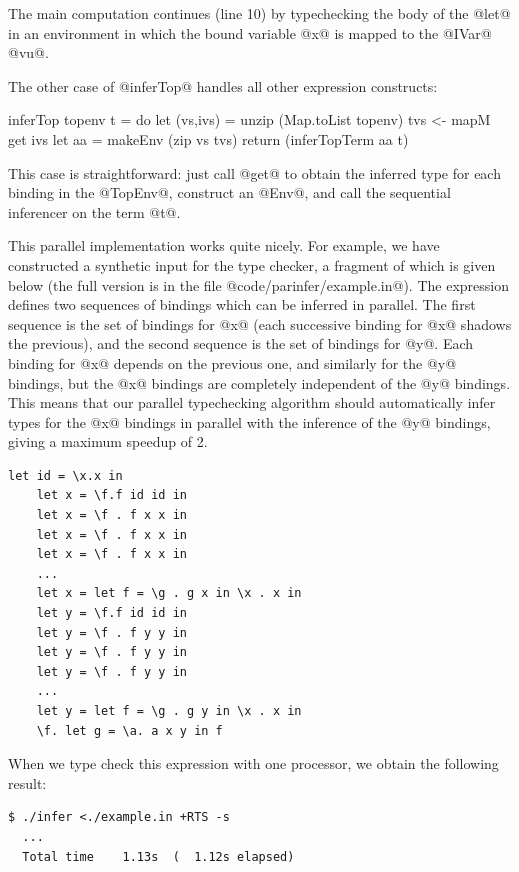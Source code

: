 The main computation continues (line 10) by typechecking the body of
the @let@ in an environment in which the bound variable @x@ is mapped
to the @IVar@ @vu@.

The other case of @inferTop@ handles all other expression constructs:

\begin{numhaskell}
inferTop topenv t = do
    let (vs,ivs) = unzip (Map.toList topenv)
    tvs <- mapM get ivs
    let aa = makeEnv (zip vs tvs)
    return (inferTopTerm aa t)
\end{numhaskell}

\noindent This case is straightforward: just call @get@ to obtain the
inferred type for each binding in the @TopEnv@, construct an
@Env@, and call the sequential inferencer on the term @t@.

This parallel implementation works quite nicely.  For example, we have
constructed a synthetic input for the type checker, a fragment of
which is given below (the full version is in the file
@code/parinfer/example.in@).  The expression defines two sequences of
bindings which can be inferred in parallel.  The first sequence is the
set of bindings for @x@ (each successive binding for @x@ shadows the
previous), and the second sequence is the set of bindings for @y@.
Each binding for @x@ depends on the previous one, and similarly for
the @y@ bindings, but the @x@ bindings are completely independent of
the @y@ bindings.  This means that our parallel typechecking algorithm
should automatically infer types for the @x@ bindings in parallel with
the inference of the @y@ bindings, giving a maximum speedup of 2.

{\small \begin{verbatim}
let id = \x.x in
    let x = \f.f id id in
    let x = \f . f x x in
    let x = \f . f x x in
    let x = \f . f x x in
    ...
    let x = let f = \g . g x in \x . x in
    let y = \f.f id id in
    let y = \f . f y y in
    let y = \f . f y y in
    let y = \f . f y y in
    ...
    let y = let f = \g . g y in \x . x in
    \f. let g = \a. a x y in f
\end{verbatim}}

\noindent When we type check this expression with one processor, we
obtain the following result:

{\small \begin{verbatim}
$ ./infer <./example.in +RTS -s
  ...
  Total time    1.13s  (  1.12s elapsed)
\end{verbatim}}

